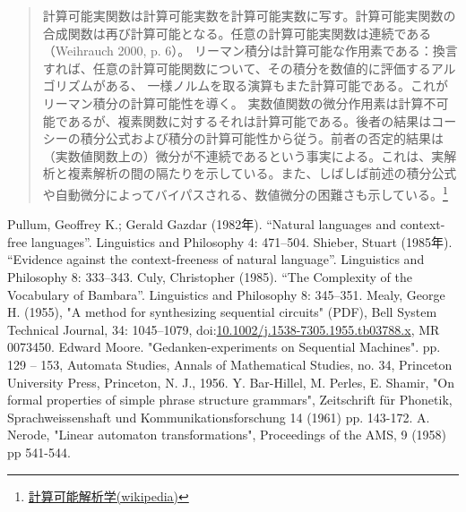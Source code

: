 \documentclass[uplatex, dvipdfmx]{jsreport}
\begin{document}
\begin{quotation}
    計算可能実関数は計算可能実数を計算可能実数に写す。計算可能実関数の合成関数は再び計算可能となる。任意の計算可能実関数は連続である（Weihrauch 2000, p. 6）。
    リーマン積分は計算可能な作用素である：換言すれば、任意の計算可能関数について、その積分を数値的に評価するアルゴリズムがある、
    一様ノルムを取る演算もまた計算可能である。これがリーマン積分の計算可能性を導く。
    実数値関数の微分作用素は計算不可能であるが、複素関数に対するそれは計算可能である。後者の結果はコーシーの積分公式および積分の計算可能性から従う。前者の否定的結果は（実数値関数上の）微分が不連続であるという事実による。これは、実解析と複素解析の間の隔たりを示している。また、しばしば前述の積分公式や自動微分によってバイパスされる、数値微分の困難さも示している。\footnote{\href{https://ja.wikipedia.org/wiki/計算可能解析学}{計算可能解析学(wikipedia)}}
\end{quotation}

\begin{thebibliography}{99}
    Pullum, Geoffrey K.; Gerald Gazdar (1982年). “Natural languages and context-free languages”. Linguistics and Philosophy 4: 471–504.
    Shieber, Stuart (1985年). “Evidence against the context-freeness of natural language”. Linguistics and Philosophy 8: 333–343.
    Culy, Christopher (1985). “The Complexity of the Vocabulary of Bambara”. Linguistics and Philosophy 8: 345–351.
    Mealy, George H. (1955), "A method for synthesizing sequential circuits" (PDF), Bell System Technical Journal, 34: 1045–1079, doi:\url{10.1002/j.1538-7305.1955.tb03788.x}, MR 0073450.
    Edward Moore. "Gedanken-experiments on Sequential Machines". pp. 129 – 153, Automata Studies, Annals of Mathematical Studies, no. 34, Princeton University Press, Princeton, N. J., 1956.
    Y. Bar-Hillel, M. Perles, E. Shamir, "On formal properties of simple phrase structure grammars", Zeitschrift für Phonetik, Sprachweissenshaft und Kommunikationsforschung 14 (1961) pp. 143-172.
    A. Nerode, "Linear automaton transformations", Proceedings of the AMS, 9 (1958) pp 541-544.
\end{thebibliography}
\end{document}
